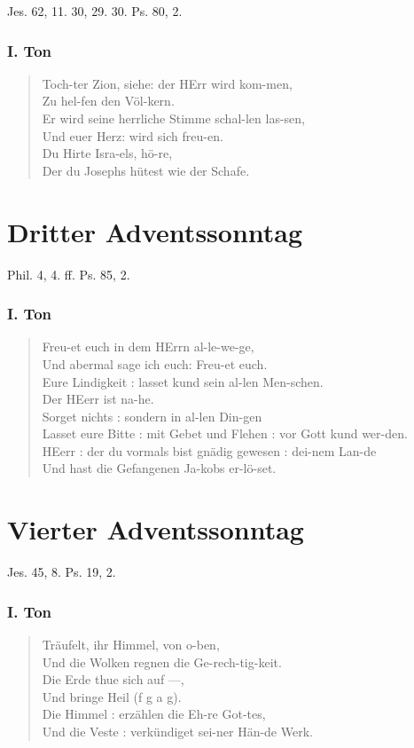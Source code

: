 Jes. 62, 11. 30, 29. 30. Ps. 80, 2.

\subsubsection{I. Ton}
\begin{verse}
Toch-ter Zion, siehe: der HErr wird kom-men,\\
Zu hel-fen den Völ-kern.\\
Er wird seine herrliche Stimme schal-len las-sen,\\
Und euer Herz: wird sich freu-en.\\
Du Hirte Isra-els, hö-re,\\
Der du Josephs hütest wie der Schafe.
\end{verse}

\section{Dritter Adventssonntag}

Phil. 4, 4. ff. Ps. 85, 2.

\subsubsection{I. Ton}
\begin{verse}
Freu-et euch in dem HErrn al-le-we-ge,\\
Und abermal sage ich euch: Freu-et euch.\\
Eure Lindigkeit : lasset kund sein al-len Men-schen.\\
Der HEerr ist na-he.\\
Sorget nichts : sondern in al-len Din-gen\\
Lasset eure Bitte : mit Gebet und Flehen : vor Gott kund wer-den.\\
HEerr : der du vormals bist gnädig gewesen : dei-nem Lan-de\\
Und hast die Gefangenen Ja-kobs er-lö-set.
\end{verse}

\section{Vierter Adventssonntag}

Jes. 45, 8. Ps. 19, 2.

\subsubsection{I. Ton}
\begin{verse}
Träufelt, ihr Himmel, von o-ben,\\
Und die Wolken regnen die Ge-rech-tig-keit.\\
Die Erde thue sich auf —,\\
Und bringe Heil (f g a g).\\
Die Himmel : erzählen die Eh-re Got-tes,\\
Und die Veste : verkündiget sei-ner Hän-de Werk.
\end{verse}

